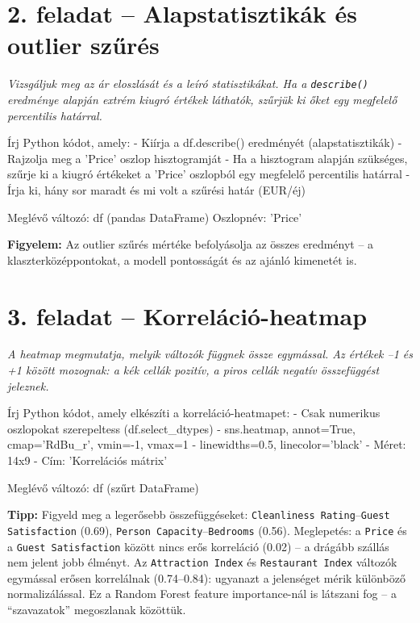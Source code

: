 \documentclass[11pt,a4paper]{article}
\newcommand{\warn}[1]{%
  \vspace{3pt}%
  \begin{tcolorbox}[warnstyle]%
  \textbf{\textcolor{warnborder}{Figyelem:}} #1%
  \end{tcolorbox}\vspace{2pt}}
\newcommand{\tip}[1]{%
  \vspace{3pt}%
  \begin{tcolorbox}[tipstyle]%
  \textbf{\textcolor{tipborder}{Tipp:}} #1%
  \end{tcolorbox}\vspace{2pt}}
\begin{document}
\section{2. feladat -- Alapstatisztikák és outlier szűrés}

\noindent\textit{Vizsgáljuk meg az ár eloszlását és a leíró statisztikákat.
Ha a \texttt{describe()} eredménye alapján extrém kiugró értékek láthatók,
szűrjük ki őket egy megfelelő percentilis határral.}

\begin{prompt}
Írj Python kódot, amely:
- Kiírja a df.describe() eredményét (alapstatisztikák)
- Rajzolja meg a 'Price' oszlop hisztogramját
- Ha a hisztogram alapján szükséges, szűrje ki a kiugró
  értékeket a 'Price' oszlopból egy megfelelő percentilis határral
- Írja ki, hány sor maradt és mi volt a szűrési határ (EUR/éj)

Meglévő változó: df (pandas DataFrame)
Oszlopnév: 'Price'
\end{prompt}

\warn{Az outlier szűrés mértéke befolyásolja az összes
eredményt -- a klaszterközéppontokat, a modell pontosságát és az
ajánló kimenetét is.}

\section{3. feladat -- Korreláció-heatmap}

\noindent\textit{A heatmap megmutatja, melyik változók függnek össze egymással.
Az értékek --1 és +1 között mozognak: a kék cellák pozitív, a piros cellák
negatív összefüggést jeleznek.}

\begin{prompt}
Írj Python kódot, amely elkészíti a korreláció-heatmapet:
- Csak numerikus oszlopokat szerepeltess (df.select_dtypes)
- sns.heatmap, annot=True, cmap='RdBu_r', vmin=-1, vmax=1
- linewidths=0.5, linecolor='black'
- Méret: 14x9
- Cím: 'Korrelációs mátrix'

Meglévő változó: df (szűrt DataFrame)
\end{prompt}

\tip{Figyeld meg a legerősebb összefüggéseket: \texttt{Cleanliness Rating}--\texttt{Guest Satisfaction} (0.69),
\texttt{Person Capacity}--\texttt{Bedrooms} (0.56).
Meglepetés: a \texttt{Price} és a \texttt{Guest Satisfaction} között nincs erős korreláció (0.02) --
a drágább szállás nem jelent jobb élményt.
Az \texttt{Attraction Index} és \texttt{Restaurant Index} változók egymással erősen korrelálnak (0.74--0.84):
ugyanazt a jelenséget mérik különböző normalizálással.
Ez a Random Forest feature importance-nál is látszani fog -- a ``szavazatok'' megoszlanak közöttük.}
\end{document}
